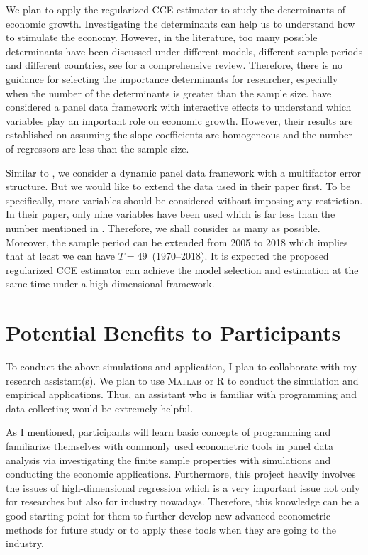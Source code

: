 \documentclass[11pt,a4paper]{article}
\theoremstyle{definition}
\begin{document}
We plan to apply the regularized CCE estimator to study the determinants of economic growth. Investigating the determinants can help us to understand how to stimulate the economy. However, in the literature, too many possible determinants have been discussed under different models, different sample periods and different countries, see \citet{Durlauf2005} for a comprehensive review.
Therefore, there is no guidance for selecting the importance determinants for researcher, especially when the number of the determinants is greater than the sample size. \citet{Lu2016} have considered a panel data framework with interactive effects to understand which variables play an important role on economic growth. However, their results are established on assuming the slope coefficients are homogeneous and the number of regressors are less than the sample size.

Similar to \citet{Lu2016}, we consider a dynamic panel data framework with a multifactor error structure. But we would like to extend the data used in their paper first. To be specifically, more variables should be considered without imposing any restriction. In their paper, only nine variables have been used which is far less than the number mentioned in \citet{Durlauf2005}. Therefore, we shall consider as many as possible. Moreover, the sample period can be extended from 2005 to 2018 which implies that at least we can have $T=49$~(1970--2018). It is expected the proposed  regularized CCE estimator can achieve the model selection and estimation at the same time under a high-dimensional framework.


\section{Potential Benefits to Participants}\label{Sec:expectations}
To conduct the above simulations and application, I plan to collaborate with my research assistant(s). We plan to use \textsc{Matlab} or \textsc{R} to conduct the simulation and empirical applications. Thus, an assistant who is familiar with  programming and data collecting would be extremely helpful.

As I mentioned, participants will learn basic concepts of programming and familiarize themselves with commonly used econometric tools in panel data analysis via investigating the finite sample properties with simulations and conducting the economic applications. Furthermore, this project heavily involves the issues of high-dimensional regression which is a very important issue not only for researches but also for industry nowadays. Therefore, this knowledge can be a good starting point for them to further develop new advanced econometric methods for future study or to apply these tools when they are going to the industry.


\bigskip




\end{document}
